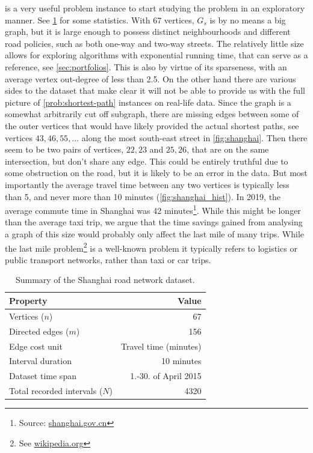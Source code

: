  is a very useful problem instance to start studying the  problem in an exploratory manner. See \cref{tab:shanghai-stats} for some statistics. With 67 vertices, $G_s$ is by no means a big graph, but it is large enough to possess distinct neighbourhoods and different road policies, such as both one-way and two-way streets. The relatively little size allows for exploring algorithms with exponential running time, that can serve as a reference, see \cref{sec:portfolios}. This is also by virtue of its sparseness, with an average vertex out-degree of less than 2.5.
On the other hand there are various sides to the dataset that make clear it will not be able to provide us with the full picture of \cref{prob:shortest-path} instances on real-life data. Since the graph is a somewhat arbitrarily cut off subgraph, there are missing edges between some of the outer vertices that would have likely provided the actual shortest paths, see vertices $43, 46, 55, \dots$ along the most south-east street in \cref{fig:shanghai}. Then there seem to be two pairs of vertices, $22,23$ and $25,26$, that are on the same intersection, but don't share any edge. This could be entirely truthful due to some obstruction on the road, but it is likely to be an error in the data.
But most importantly the average travel time between any two vertices is typically less than 5, and never more than 10 minutes (\cref{fig:shanghai_hist}). In 2019, the average commute time in Shanghai was 42 minutes\footnote{Source: \href{https://service.shanghai.gov.cn/sheninfo/specialdetail.aspx?Id=01de1f87-936d-4999-ba8c-0dffaa397ffb}{shanghai.gov.cn}}. While this might be longer than the average taxi trip, we argue that the time savings gained from analysing a graph of this size would probably only affect the last mile of many trips. While the last mile problem\footnote{See \href{https://en.wikipedia.org/wiki/Last\_mile\_(transportation)}{wikipedia.org}} is a well-known problem it typically refers to logistics or public transport networks, rather than taxi or car trips.

\renewcommand{\arraystretch}{1.2}
\begin{table}[htbp]
\centering
\begin{tabular}{lr}
\textbf{Property} & \textbf{Value} \\
\hline
Vertices ($n$) & 67 \\
Directed edges ($m$) & 156 \\
Edge cost unit & Travel time (minutes) \\
Interval duration & 10 minutes \\
Dataset time span & 1.-30. of April 2015 \\
Total recorded intervals ($N$) & 4320 \\
\hline
\end{tabular}
\vspace{5pt}
\caption{Summary of the Shanghai road network dataset.}
\label{tab:shanghai-stats}
\end{table}


